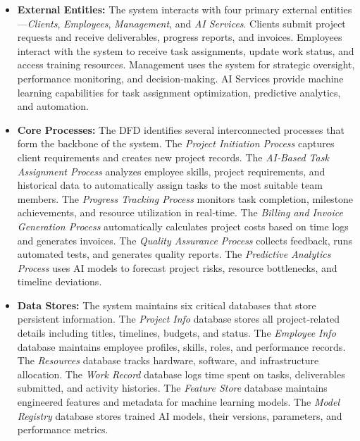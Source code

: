 \documentclass[12pt,a4paper]{article}
\begin{document}
\begin{itemize}
    \item \textbf{External Entities:} The system interacts with four primary external entities—\textit{Clients}, \textit{Employees}, \textit{Management}, and \textit{AI Services}.  Clients submit project requests and receive deliverables, progress reports, and invoices.  Employees interact with the system to receive task assignments, update work status, and access training resources.  Management uses the system for strategic oversight, performance monitoring, and decision‑making.  AI Services provide machine learning capabilities for task assignment optimization, predictive analytics, and automation.

    \item \textbf{Core Processes:} The DFD identifies several interconnected processes that form the backbone of the system.  The \textit{Project Initiation Process} captures client requirements and creates new project records.  The \textit{AI‑Based Task Assignment Process} analyzes employee skills, project requirements, and historical data to automatically assign tasks to the most suitable team members.  The \textit{Progress Tracking Process} monitors task completion, milestone achievements, and resource utilization in real‑time.  The \textit{Billing and Invoice Generation Process} automatically calculates project costs based on time logs and generates invoices.  The \textit{Quality Assurance Process} collects feedback, runs automated tests, and generates quality reports.  The \textit{Predictive Analytics Process} uses AI models to forecast project risks, resource bottlenecks, and timeline deviations.

    \item \textbf{Data Stores:} The system maintains six critical databases that store persistent information.  The \textit{Project Info} database stores all project‑related details including titles, timelines, budgets, and status.  The \textit{Employee Info} database maintains employee profiles, skills, roles, and performance records.  The \textit{Resources} database tracks hardware, software, and infrastructure allocation.  The \textit{Work Record} database logs time spent on tasks, deliverables submitted, and activity histories.  The \textit{Feature Store} database maintains engineered features and metadata for machine learning models.  The \textit{Model Registry} database stores trained AI models, their versions, parameters, and performance metrics.


\end{itemize}
\end{document}
